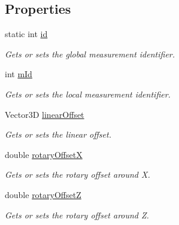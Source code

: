 \subsection*{Properties}
\begin{DoxyCompactItemize}
\item 
static int \hyperlink{class_l_i_d_a_r___controller_1_1_measurement_a1aa9b624e651ef61b95f13fe5cb8f326}{id}
\begin{DoxyCompactList}\small\item\em Gets or sets the global measurement identifier. \end{DoxyCompactList}\item 
int \hyperlink{class_l_i_d_a_r___controller_1_1_measurement_ac3e8a45ae2970e9d3a538fbc09c5b60b}{m\+Id}
\begin{DoxyCompactList}\small\item\em Gets or sets the local measurement identifier. \end{DoxyCompactList}\item 
Vector3D \hyperlink{class_l_i_d_a_r___controller_1_1_measurement_a00cfc32b350bb7516008ec96ad557f8d}{linear\+Offset}
\begin{DoxyCompactList}\small\item\em Gets or sets the linear offset. \end{DoxyCompactList}\item 
double \hyperlink{class_l_i_d_a_r___controller_1_1_measurement_a26ac087dbaf4f45ee4550cf5668ae4ff}{rotary\+OffsetX}
\begin{DoxyCompactList}\small\item\em Gets or sets the rotary offset around X. \end{DoxyCompactList}\item 
double \hyperlink{class_l_i_d_a_r___controller_1_1_measurement_aeb96de05257dd310531350f3af1eb47e}{rotary\+OffsetZ}
\begin{DoxyCompactList}\small\item\em Gets or sets the rotary offset around Z. \end{DoxyCompactList}\end{DoxyCompactItemize}
